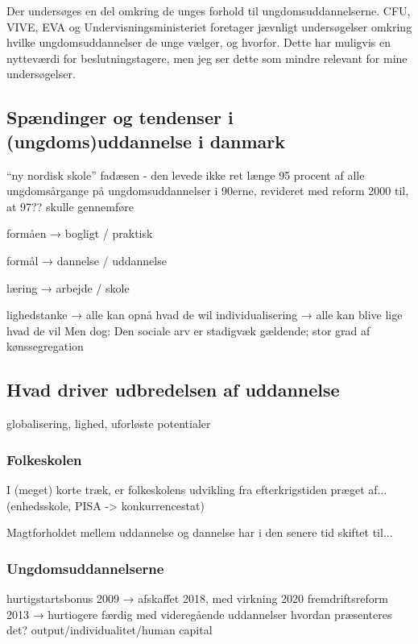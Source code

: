 Der undersøges en del omkring de unges forhold til ungdomsuddannelserne. CFU, VIVE, EVA og Undervisningsministeriet foretager jævnligt undersøgelser omkring hvilke ungdomsuddannelser de unge vælger, og hvorfor.
Dette har muligvis en nytteværdi for beslutningstagere, men jeg ser dette som mindre relevant for mine undersøgelser.


\subsection{Spændinger og tendenser i (ungdoms)uddannelse i danmark}

“ny nordisk skole” fadæsen - den levede ikke ret længe
95 procent af alle ungdomsårgange på ungdomsuddannelser i 90erne, revideret med reform 2000 til, at 97?? skulle gennemføre

formåen → bogligt / praktisk

formål → dannelse / uddannelse

læring → arbejde / skole

lighedstanke  → alle kan opnå hvad de wil
individualisering → alle kan blive lige hvad de vil
Men dog: Den sociale arv er stadigvæk gældende; stor grad af kønssegregation


\subsection{Hvad driver udbredelsen af uddannelse}


globalisering, lighed, uforløste potentialer

\subsubsection{Folkeskolen}
I (meget) korte træk, er folkeskolens udvikling fra efterkrigstiden præget af... (enhedsskole, PISA -> konkurrencestat)

Magtforholdet mellem uddannelse og dannelse har i den senere tid skiftet til...

\subsubsection{Ungdomsuddannelserne}

hurtigstartsbonus 2009 → afskaffet 2018, med virkning 2020
fremdriftsreform 2013 → hurtiogere færdig med videregående uddannelser
hvordan præsenteres det? output/individualitet/human capital
